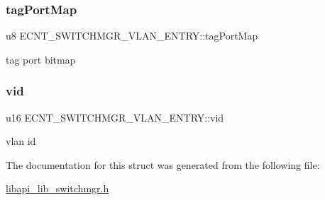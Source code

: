 \subsubsection{\texorpdfstring{tag\+Port\+Map}{tagPortMap}}
{\footnotesize\ttfamily u8 E\+C\+N\+T\+\_\+\+S\+W\+I\+T\+C\+H\+M\+G\+R\+\_\+\+V\+L\+A\+N\+\_\+\+E\+N\+T\+R\+Y\+::tag\+Port\+Map}

tag port bitmap \mbox{\label{structECNT__SWITCHMGR__VLAN__ENTRY_a02c99272ffabf1368d0ccc58d75fe95a}} 
\subsubsection{\texorpdfstring{vid}{vid}}
{\footnotesize\ttfamily u16 E\+C\+N\+T\+\_\+\+S\+W\+I\+T\+C\+H\+M\+G\+R\+\_\+\+V\+L\+A\+N\+\_\+\+E\+N\+T\+R\+Y\+::vid}

vlan id 

The documentation for this struct was generated from the following file\+:\begin{DoxyCompactItemize}
\item 
\hyperlink{libapi__lib__switchmgr_8h}{libapi\+\_\+lib\+\_\+switchmgr.\+h}\end{DoxyCompactItemize}

